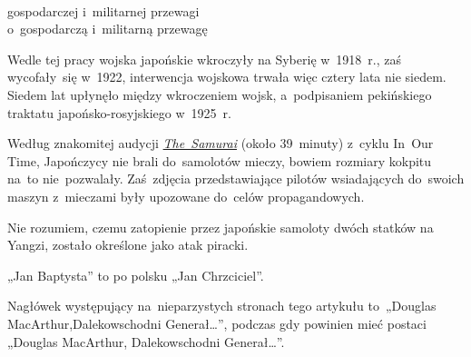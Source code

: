 \documentclass[a4paper,11pt]{article}
\begin{document}
\noindent
{} \\
\Jest  gospodarczej i~militarnej przewagi \\
\Powin o~gospodarczą i~militarną przewagę \\

\vspace{\spaceTwo}










\newpage
{}




\start {} Wedle tej pracy wojska japońskie wkroczyły na Syberię
w~1918~r., zaś wycofały~się w~1922, interwencja wojskowa trwała więc
cztery lata nie siedem. Siedem lat upłynęło między wkroczeniem wojsk,
a~podpisaniem pekińskiego traktatu japońsko-rosyjskiego w~1925~r.

\vspace{\spaceFour}



\start {} Według znakomitej audycji
\href{https://www.bbc.co.uk/programmes/b00pcm9f}{\textit{The~Samurai}}
(około 39~minuty) z~cyklu In~Our Time, Japończycy nie brali
do~samolotów mieczy, bowiem rozmiary kokpitu na~to nie~pozwalały.
Zaś~zdjęcia przedstawiające pilotów wsiadających do~swoich maszyn
z~mieczami były upozowane do~celów propagandowych.

\vspace{\spaceFour}



\start {} Nie rozumiem, czemu zatopienie przez japońskie
samoloty dwóch statków na Yangzi, zostało określone jako atak piracki.

\vspace{\spaceFour}



\start {} „Jan Baptysta” to po polsku „Jan Chrzciciel”.

\vspace{\spaceFour}



\start {} Nagłówek występujący na~nieparzystych stronach tego
artykułu to~„Douglas MacArthur,Dalekowschodni Generał\ldots”, podczas gdy
powinien mieć postaci „Douglas MacArthur, Dalekowschodni Generał\ldots”.
\end{document}
